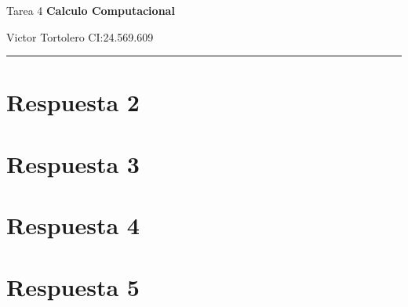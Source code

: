 \documentclass{article}
\begin{document}
\flushleft
\setlength{\parindent}{20pt}

\justify
\centerline{\huge Tarea 4 \textbf{Calculo Computacional}}
\centerline{Victor Tortolero CI:24.569.609}  %
\vspace{0.1cm}
\hrule

\section*{Respuesta 2}

\newpage

\section*{Respuesta 3}

\newpage

\section*{Respuesta 4}

\newpage

\section*{Respuesta 5}

\newpage
\end{document}
